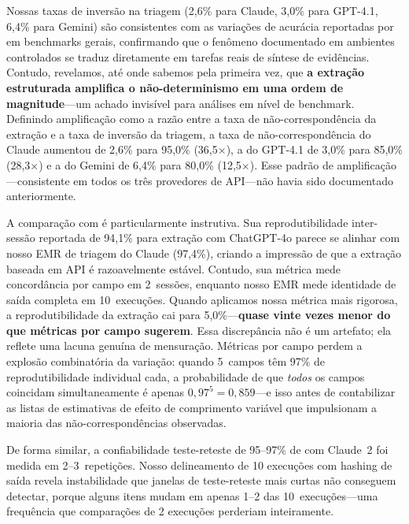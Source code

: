 \documentclass[12pt, a4paper]{article}
\begin{document}
Nossas taxas de inversão na triagem (2,6\% para Claude, 3,0\% para GPT-4.1, 6,4\% para Gemini) são consistentes com as variações de acurácia reportadas por \citet{atil2024nondeterminism} em benchmarks gerais, confirmando que o fenômeno documentado em ambientes controlados se traduz diretamente em tarefas reais de síntese de evidências.
Contudo, revelamos, até onde sabemos pela primeira vez, que \textbf{a extração estruturada amplifica o não-determinismo em uma ordem de magnitude}---um achado invisível para análises em nível de benchmark.
Definindo amplificação como a razão entre a taxa de não-correspondência da extração e a taxa de inversão da triagem, a taxa de não-correspondência do Claude aumentou de 2,6\% para 95,0\% (36,5$\times$), a do GPT-4.1 de 3,0\% para 85,0\% (28,3$\times$) e a do Gemini de 6,4\% para 80,0\% (12,5$\times$).
Esse padrão de amplificação---consistente em todos os três provedores de API---não havia sido documentado anteriormente.

A comparação com \citet{jensen2025chatgpt} é particularmente instrutiva.
Sua reprodutibilidade inter-sessão reportada de 94,1\% para extração com ChatGPT-4o parece se alinhar com nosso EMR de triagem do Claude (97,4\%), criando a impressão de que a extração baseada em API é razoavelmente estável.
Contudo, sua métrica mede concordância por campo em 2~sessões, enquanto nosso EMR mede identidade de saída completa em 10~execuções.
Quando aplicamos nossa métrica mais rigorosa, a reprodutibilidade da extração cai para 5,0\%---\textbf{quase vinte vezes menor do que métricas por campo sugerem}.
Essa discrepância não é um artefato; ela reflete uma lacuna genuína de mensuração.
Métricas por campo perdem a explosão combinatória da variação: quando 5~campos têm 97\% de reprodutibilidade individual cada, a probabilidade de que \emph{todos} os campos coincidam simultaneamente é apenas $0,97^5 = 0,859$---e isso antes de contabilizar as listas de estimativas de efeito de comprimento variável que impulsionam a maioria das não-correspondências observadas.

De forma similar, a confiabilidade teste-reteste de 95--97\% de \citet{gartlehner2024extraction} com Claude~2 foi medida em 2--3~repetições.
Nosso delineamento de 10 execuções com hashing de saída revela instabilidade que janelas de teste-reteste mais curtas não conseguem detectar, porque alguns itens mudam em apenas 1--2 das 10~execuções---uma frequência que comparações de 2 execuções perderiam inteiramente.
\end{document}
